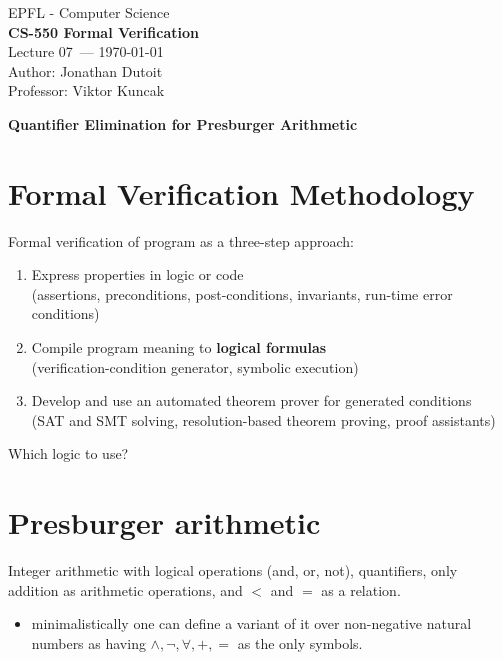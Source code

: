 \documentclass[11pt]{article}
\newcommand{\coursename}{CS-550 Formal Verification}
\newcommand{\lecturenum}{07}
\newcommand{\lecturedate}{\today}
\newcommand{\professor}{Viktor Kuncak}
\begin{document}
\begin{center}
  {\large EPFL - Computer Science} \\[0.5em]
  {\Large \textbf{\coursename}} \\[0.5em]
  {\large Lecture \lecturenum\ --- \lecturedate} \\[0.5em]
  {\large Author: Jonathan Dutoit} \\[0.5em]
  {\large Professor: \professor} \\[0.5em]
\end{center}

\vspace{1.5cm}

\begin{center}
  {\LARGE \textbf{Quantifier Elimination for Presburger Arithmetic}}
\end{center}

\vspace{1cm}

\section*{Formal Verification Methodology}

Formal verification of program as a three-step approach: 
\begin{enumerate}
	\item Express properties in logic or code \\ 
		(assertions, preconditions, post-conditions, invariants, run-time error conditions) 
	\item Compile program meaning to \textbf{logical formulas}  \\
	(verification-condition generator, symbolic execution)
\item Develop and use an automated theorem prover for generated conditions \\
	(SAT and SMT solving, resolution-based theorem proving, proof assistants)
\end{enumerate}

Which logic to use? 

\section*{Presburger arithmetic}

Integer arithmetic with logical operations (and, or, not), quantifiers, only addition as arithmetic operations, and $<$ and $=$ as a relation. 
\begin{itemize}
	\item minimalistically one can define a variant of it over non-negative natural numbers as having $\land, \neg, \forall, +, =$ as the only symbols. 
\end{itemize}
\end{document}
